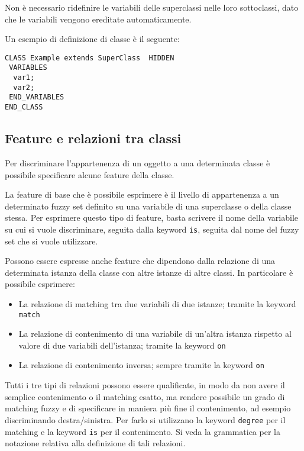 Non è necessario ridefinire le variabili delle superclassi nelle loro sottoclassi, dato che le variabili vengono ereditate automaticamente.

Un esempio di definizione di classe è il seguente:

\begin{verbatim}
CLASS Example extends SuperClass  HIDDEN
 VARIABLES
  var1;
  var2;
 END_VARIABLES
END_CLASS
\end{verbatim}


\subsection{Feature e relazioni tra classi}

Per discriminare l'appartenenza di un oggetto a una determinata classe è possibile specificare alcune feature della classe.

La feature di base che è possibile esprimere è il livello di appartenenza a un determinato fuzzy set definito su una variabile di una superclasse o della classe stessa. 
Per esprimere questo tipo di feature, basta scrivere il nome della variabile su cui si vuole discriminare, seguita dalla keyword \verb|is|, seguita dal nome del fuzzy set che si vuole utilizzare.


Possono essere espresse anche feature che dipendono dalla relazione di una determinata istanza della classe con altre istanze di altre classi.
In particolare è possibile esprimere:

\begin{itemize}
 \item La relazione di matching tra due variabili di due istanze; tramite la keyword \verb|match|
 \item La relazione di contenimento di una variabile di un'altra istanza rispetto al valore di due variabili dell'istanza; tramite la keyword \verb|on|
 \item La relazione di contenimento inversa; sempre tramite la keyword \verb|on|
\end{itemize}

Tutti i tre tipi di relazioni possono essere qualificate, in modo da non avere il semplice contenimento o il matching esatto, ma rendere possibile un grado di matching fuzzy e di specificare in maniera più fine il contenimento, ad esempio discriminando destra/sinistra. Per farlo si utilizzano la keyword \verb|degree| per il matching e la keyword \verb|is| per il contenimento. Si veda la grammatica per la notazione relativa alla definizione di tali relazioni.

